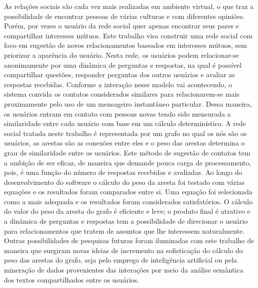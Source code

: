 \begin{resumo}
\singlespacing
\noindent
As relações sociais são cada vez mais realizadas em ambiente virtual, o que traz a possibilidade de encontrar pessoas de várias culturas e com diferentes opiniões. Porém, por vezes o usuário da rede social quer apenas encontrar seus pares e compartilhar interesses mútuos. Este trabalho visa construir uma rede social com foco em sugestão de novos relacionamentos baseados em interesses mútuos, sem priorizar a aparência do usuário. Nesta rede, os usuários podem relacionar-se anonimamente por uma dinâmica de perguntas e respostas, na qual é possível compartilhar questões, responder perguntas dos outros usuários e avaliar as respostas recebidas. Conforme a interação nesse modelo vai acontecendo, o sistema convida os contatos considerados similares para relacionarem-se mais proximamente pelo uso de um mensageiro instantâneo particular. Dessa maneira, os usuários entram em contato com pessoas novas tendo sido mensurada a similaridade entre cada usuário com base em um cálculo determinístico. A rede social tratada neste trabalho é representada por um grafo no qual os nós são os usuários, as arestas são as conexões entre eles e o peso das arestas determina o grau de similaridade entre os usuários. Este método de sugestão de contatos tem a ambição de ser eficaz, de maneira que demande pouca carga de processamento, pois, é uma função do número de respostas recebidas e avaliadas. Ao longo do desenvolvimento do software o cálculo do peso da aresta foi testado com várias equações e os resultados foram comparados  entre si. Uma equação foi selecionada como a mais adequada e os resultados foram considerados satisfatórios. O cálculo do valor do peso da aresta do grafo é eficiente e leve; o produto final é atrativo e a dinâmica de perguntas e respostas tem a possibilidade de direcionar o usuário para relacionamentos que tratem de assuntos que lhe interessem naturalmente. Outras possibilidades de pesquisas futuras foram iluminadas com este trabalho de maneira que surgiram novas ideias de incremento na sofisticação do cálculo do peso das arestas do grafo, seja pelo emprego de inteligência artificial ou pela mineração de dados provenientes das interações por meio da análise semântica dos textos compartilhados entre os usuários.

\end{resumo}
